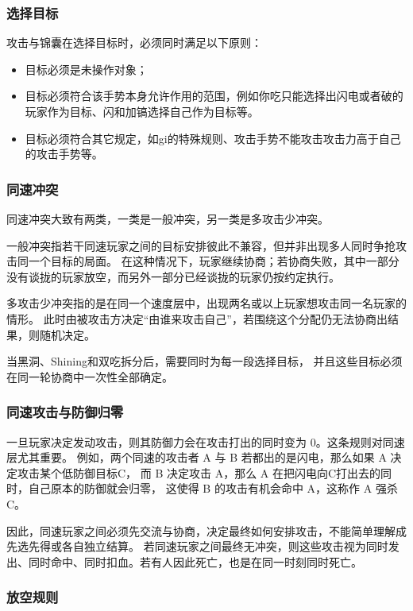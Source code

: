 \documentclass[12pt]{ctexart}
\begin{document}
\subsubsection{选择目标}

攻击与锦囊在选择目标时，必须同时满足以下原则：

\begin{itemize}
    \item 目标必须是未操作对象；
    \item 目标必须符合该手势本身允许作用的范围，例如你吃只能选择出闪电或者破的玩家作为目标、闪和加镐选择自己作为目标等。
    \item 目标必须符合其它规定，如gi的特殊规则、攻击手势不能攻击攻击力高于自己的攻击手势等。
\end{itemize}

\subsubsection{同速冲突}

同速冲突大致有两类，一类是一般冲突，另一类是多攻击少冲突。

一般冲突指若干同速玩家之间的目标安排彼此不兼容，但并非出现多人同时争抢攻击同一个目标的局面。
在这种情况下，玩家继续协商；若协商失败，其中一部分没有谈拢的玩家放空，而另外一部分已经谈拢的玩家仍按约定执行。

多攻击少冲突指的是在同一个速度层中，出现两名或以上玩家想攻击同一名玩家的情形。
此时由被攻击方决定“由谁来攻击自己”，若围绕这个分配仍无法协商出结果，则随机决定。

当黑洞、Shining和双吃拆分后，需要同时为每一段选择目标，
并且这些目标必须在同一轮协商中一次性全部确定。

\subsubsection{同速攻击与防御归零}

一旦玩家决定发动攻击，则其防御力会在攻击打出的同时变为 0。这条规则对同速层尤其重要。
例如，两个同速的攻击者 A 与 B 若都出的是闪电，那么如果 A 决定攻击某个低防御目标C，
而 B 决定攻击 A，那么 A 在把闪电向C打出去的同时，自己原本的防御就会归零，
这使得 B 的攻击有机会命中 A，这称作 A 强杀 C。

因此，同速玩家之间必须先交流与协商，决定最终如何安排攻击，不能简单理解成先选先得或各自独立结算。
若同速玩家之间最终无冲突，则这些攻击视为同时发出、同时命中、同时扣血。若有人因此死亡，也是在同一时刻同时死亡。

\subsubsection{放空规则}
\end{document}
